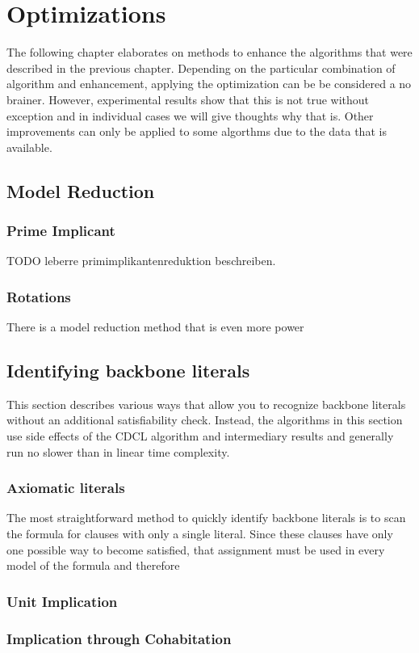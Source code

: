 \chapter{Optimizations}
The following chapter elaborates on methods to enhance the algorithms that were described in the previous chapter. Depending on the particular combination of algorithm and enhancement, applying the optimization can be be considered a no brainer. However, experimental results show that this is not true without exception and in individual cases we will give thoughts why that is. Other improvements can only be applied to some algorthms due to the data that is available.

\section{Model Reduction}



\subsection{Prime Implicant}
TODO leberre primimplikantenreduktion beschreiben.

\subsection{Rotations}


There is a model reduction method that is even more power	

\section{Identifying backbone literals}
This section describes various ways that allow you to recognize backbone literals without an additional satisfiability check. Instead, the algorithms in this section use side effects of the CDCL algorithm and intermediary results and generally run no slower than in linear time complexity.
\subsection{Axiomatic literals}
The most straightforward method to quickly identify backbone literals is to scan the formula for clauses with only a single literal. Since these clauses have only one possible way to become satisfied, that assignment must be used in every model of the formula and therefore  
\subsection{Unit Implication}
\subsection{Implication through Cohabitation}
